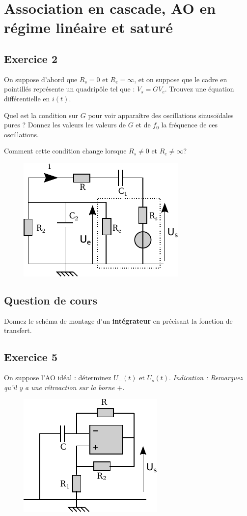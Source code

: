 \documentclass{report}
\begin{document}
\chapter{Association en cascade, AO en régime linéaire et saturé}


\section*{Exercice 2}
On suppose d'abord que $R_{s}=0$ et $R_{e}=\infty$, et on suppose que le cadre en pointillés représente un quadripôle tel que : $V_{s}=GV_{e}$. Trouvez  une équation différentielle en $i(t)$.

Quel est la condition sur $G$ pour voir apparaître des oscillations sinusoïdales pures ? Donnez les valeurs les valeurs de $G$ et de $f_{0}$ la fréquence de ces oscillations.

Comment cette condition change lorsque $R_{s}\neq 0$ et $R_{e}\neq\infty$?
\begin{figure}[!h]
\centering
\includegraphics[width=0.5\linewidth]{circuit_5.pdf}
\end{figure}

\newpage

\section*{Question de cours}
Donnez le schéma de montage d'un \textbf{intégrateur} en précisant la fonction de transfert.
\section*{Exercice 5}
On suppose l'AO idéal : déterminez $U_{-}(t)$ et $U_{s}(t)$. \textit{Indication : Remarquez qu'il y a une rétroaction sur la borne $+$}.
\begin{figure}[!h]
\centering
\includegraphics[width=0.5\linewidth]{circuit_3.pdf}
\end{figure}
\end{document}
